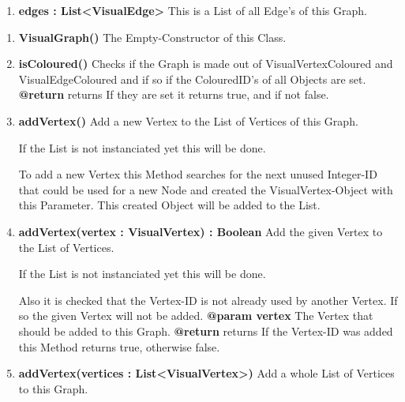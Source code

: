 \documentclass{article}
\begin{document}
\begin{enumerate}
{\begin{enumerate}[-]
{						Remenber:
						At any further Point the "Nodes" will be named Vertex/Vertices because of the confusion with JavaFx-Nodes that would otherwise occur.
					}
					\item{
						\textbf{edges : List<VisualEdge>}
						This is a List of all Edge's of this Graph.
					}
				\end{enumerate}
				\begin{enumerate}[+]
					\item{
						\textbf{VisualGraph()} \newline
						The Empty-Constructor of this Class.
						\newline
					}
					\item{
						\textbf{isColoured()} \newline
						Checks if the Graph is made out of VisualVertexColoured and VisualEdgeColoured and if so if the ColouredID's of all Objects are set.
						\newline
						\textbf{@return} returns
							If they are set it returns true, and if not false.
							\newline
					}
					\item{
						\textbf{addVertex()} \newline
						Add a new Vertex to the List of Vertices of this Graph.
						
						If the List is not instanciated yet this will be done.
						
						To add a new Vertex this Method searches for the next unused Integer-ID that could be used for a new Node and created the VisualVertex-Object with this Parameter.
						This created Object will be added to the List.
						\newline
					}
					\item{
						\textbf{addVertex(vertex : VisualVertex) : Boolean} \newline
						Add the given Vertex to the List of Vertices.
						
						If the List is not instanciated yet this will be done.
						
						Also it is checked that the Vertex-ID is not already used by another Vertex.
						If so the given Vertex will not be added.
						\newline
						\textbf{@param vertex}
							The Vertex that should be added to this Graph.
							\newline
						\textbf{@return} returns
							If the Vertex-ID was added this Method returns true, otherwise false.
							\newline
					}
					\item{
						\textbf{addVertex(vertices : List<VisualVertex>)} \newline
						Add a whole List of Vertices to this Graph.
						
}
\end{enumerate}}
\end{enumerate}
\end{document}
